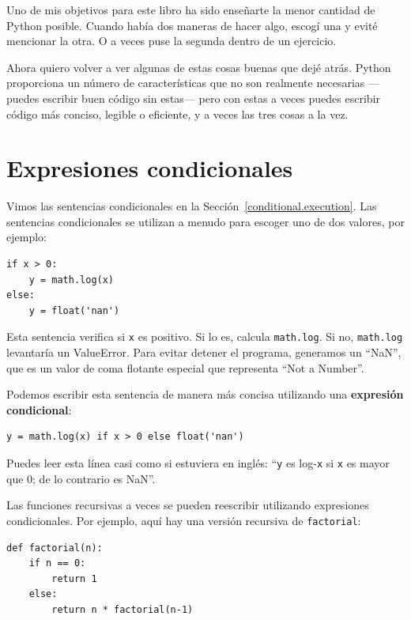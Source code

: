 \documentclass[10pt]{book}
\begin{document}
Uno de mis objetivos para este libro ha sido enseñarte la menor cantidad de Python
posible.  Cuando había dos maneras de hacer algo, escogí
una y evité mencionar la otra.  O a veces puse la segunda
dentro de un ejercicio.

Ahora quiero volver a ver algunas de estas cosas buenas que dejé atrás.
Python proporciona un número de características que no son realmente necesarias ---puedes
escribir buen código sin estas--- pero con estas a veces puedes
escribir código más conciso, legible o eficiente, y a veces
las tres cosas a la vez.


\section{Expresiones condicionales}

Vimos las sentencias condicionales en la Sección~\ref{conditional.execution}.
Las sentencias condicionales se utilizan a menudo para escoger uno de dos valores,
por ejemplo:

\begin{verbatim}
if x > 0:
    y = math.log(x)
else:
    y = float('nan')
\end{verbatim}

Esta sentencia verifica si {\tt x} es positivo.  Si lo es, calcula
{\tt math.log}.  Si no, {\tt math.log} levantaría un ValueError.  Para
evitar detener el programa, generamos un ``NaN'', que es un valor
de coma flotante especial que representa ``Not a Number''.

Podemos escribir esta sentencia de manera más concisa utilizando una {\bf expresión
condicional}:

\begin{verbatim}
y = math.log(x) if x > 0 else float('nan')
\end{verbatim}

Puedes leer esta línea casi como si estuviera en inglés: ``{\tt y} es log-{\tt x}
si {\tt x} es mayor que 0; de lo contrario es NaN''.

Las funciones recursivas a veces se pueden reescribir utilizando expresiones
condicionales.  Por ejemplo, aquí hay una versión recursiva de {\tt factorial}:

\begin{verbatim}
def factorial(n):
    if n == 0:
        return 1
    else:
        return n * factorial(n-1)
\end{verbatim}
\end{document}
